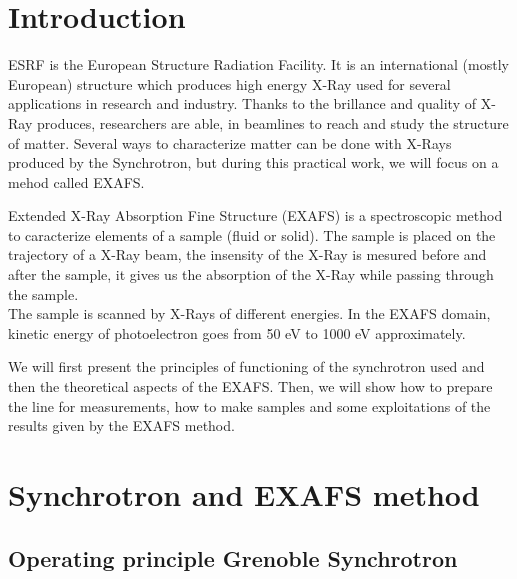 \documentclass[11pt,a4paper,oneside]{report}
\begin{document}

\pagestyle{fancy}

\chapter*{Introduction}
ESRF is the European Structure Radiation Facility. It is an international (mostly European) structure which produces high energy X-Ray used for several applications in research and industry. Thanks to the brillance and quality of X-Ray produces, researchers are able, in beamlines to reach and study the structure of matter. Several ways to characterize matter can be done with X-Rays produced by the Synchrotron, but during this practical work, we will focus on a mehod called EXAFS.

Extended X-Ray Absorption Fine Structure (EXAFS) is a spectroscopic method to caracterize elements of a sample (fluid or solid). The sample is placed on the trajectory of a X-Ray beam, the insensity of the X-Ray is mesured before and after the sample, it gives us the absorption of the X-Ray while passing through the sample.\\
The sample is scanned by X-Rays of different energies. In the EXAFS domain, kinetic energy of photoelectron goes from 50 eV to 1000 eV approximately.

We will first present the principles of functioning of the synchrotron used and then the theoretical aspects of the EXAFS. Then, we will show how to prepare the line for measurements, how to make samples and some exploitations of the results given by the EXAFS method.


\chapter{Synchrotron and EXAFS method}

\section{Operating principle Grenoble Synchrotron}
\end{document}
